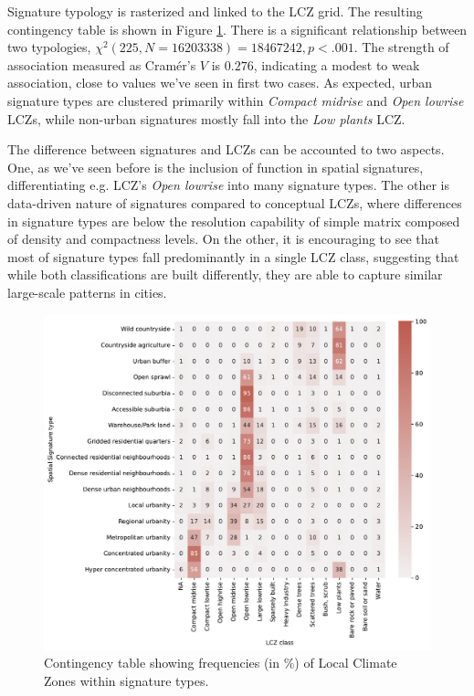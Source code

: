 Signature typology is rasterized and linked to the LCZ grid.
The resulting contingency table is shown in Figure \ref{fig:crosstab_lcz}. There is a
significant relationship between two typologies, $\chi^{2} (225, N = 16203338) = 18467242,
p < .001$. The strength of association measured as Cramér's $V$ is $0.276$, indicating
a modest to weak association, close to values we've seen in first two cases. As expected,
urban signature types are clustered primarily within \textit{Compact midrise} and
\textit{Open lowrise} LCZs, while non-urban signatures mostly fall into the \textit{Low plants} LCZ.

The difference between signatures and LCZs can be accounted to two aspects. One, as we've seen
before is the inclusion of function in spatial signatures, differentiating e.g. LCZ's \textit{Open lowrise} into
many signature types. The other is data-driven nature of signatures compared to conceptual LCZs,
where differences in signature types are below the resolution capability of simple matrix composed of
density and compactness levels. On the other, it is encouraging to see that most of signature types
fall predominantly in a single LCZ class, suggesting that while both classifications are built differently,
they are able to capture similar large-scale patterns in cities.

\begin{figure}
    \centering
    \includegraphics[width=.8\linewidth]{fig/crosstab_lcz.pdf}
    \caption{Contingency table showing frequencies (in \%) of Local Climate Zones within signature types.}
    \label{fig:crosstab_lcz}
\end{figure}

